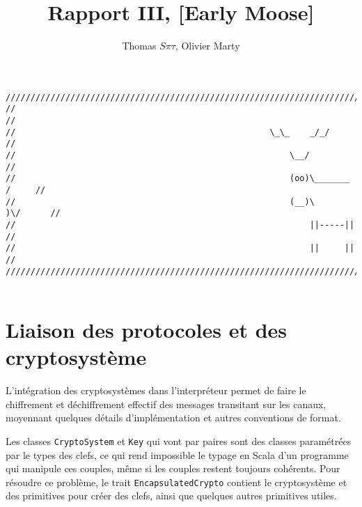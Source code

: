 \documentclass[11pt]{article} %
\title{Rapport III,  [Early Moose]}
\author{Thomas $S\pi\tau$, Olivier Marty}
\begin{document}
\maketitle

\begin{verbatim}
////////////////////////////////////////////////////////////////////////////////
//                                                                            //
//                                                   \_\_    _/_/             //
//                                                       \__/                 //
//                                                       (oo)\_______   /     //
//                                                       (__)\       )\/      //
//                                                           ||-----||        //
//                                                           ||     ||        //
////////////////////////////////////////////////////////////////////////////////  


\end{verbatim}

\section{Liaison des protocoles et des cryptosystème}

L'intégration des cryptosystèmes dans l'interpréteur permet de faire le chiffrement et déchiffrement effectif des messages transitant sur les canaux, moyennant quelques détails d'implémentation et autres conventions de format.

Les classes \texttt{CryptoSystem} et \texttt{Key} qui vont par paires sont des classes paramétrées par le types des clefs, ce qui rend impossible le typage en Scala d'un programme qui manipule ces couples, même si les couples restent toujours cohérents. Pour résoudre ce problème, le trait \texttt{EncapsulatedCrypto} contient le cryptosystème et des primitives pour créer des clefs, ainsi que quelques autres primitives utiles.
\end{document}
